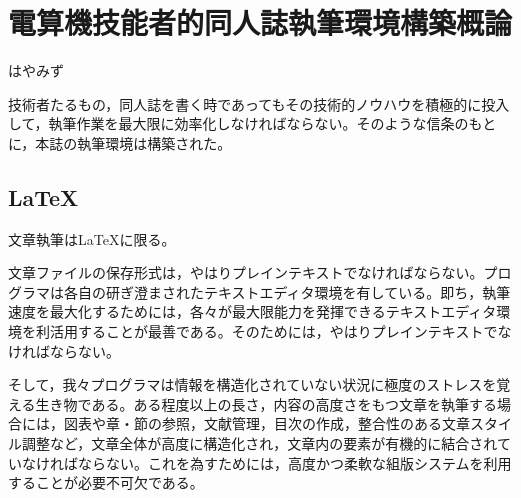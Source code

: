
\chapter{電算機技能者的同人誌執筆環境構築概論}

\begin{flushright}
 はやみず
\end{flushright}

\lettrine{技}
術者たるもの，同人誌を書く時であってもその技術的ノウハウを積極的に投入して，執筆作業を最大限に効率化しなければならない。そのような信条のもとに，本誌の執筆環境は構築された。

% 

\section{LaTeX}

文章執筆はLaTeXに限る。


文章ファイルの保存形式は，やはりプレインテキストでなければならない。プログラマは各自の研ぎ澄まされたテキストエディタ環境を有している。即ち，執筆速度を最大化するためには，各々が最大限能力を発揮できるテキストエディタ環境を利活用することが最善である。そのためには，やはりプレインテキストでなければならない。

そして，我々プログラマは情報を構造化されていない状況に極度のストレスを覚える生き物である。ある程度以上の長さ，内容の高度さをもつ文章を執筆する場合には，図表や章・節の参照，文献管理，目次の作成，整合性のある文章スタイル調整など，文章全体が高度に構造化され，文章内の要素が有機的に結合されていなければならない。これを為すためには，高度かつ柔軟な組版システムを利用することが必要不可欠である。

